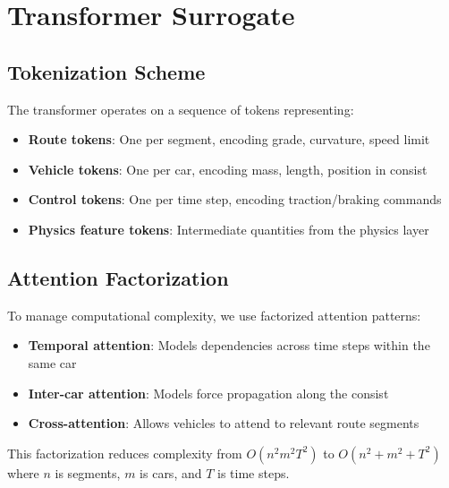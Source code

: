 
\section{Transformer Surrogate}

\subsection{Tokenization Scheme}

The transformer operates on a sequence of tokens representing:
\begin{itemize}
    \item \textbf{Route tokens}: One per segment, encoding grade, curvature, speed limit
    \item \textbf{Vehicle tokens}: One per car, encoding mass, length, position in consist
    \item \textbf{Control tokens}: One per time step, encoding traction/braking commands
    \item \textbf{Physics feature tokens}: Intermediate quantities from the physics layer
\end{itemize}


\subsection{Attention Factorization}

To manage computational complexity, we use factorized attention patterns:
\begin{itemize}
    \item \textbf{Temporal attention}: Models dependencies across time steps within the same car
    \item \textbf{Inter-car attention}: Models force propagation along the consist
    \item \textbf{Cross-attention}: Allows vehicles to attend to relevant route segments
\end{itemize}

This factorization reduces complexity from $O(n^2 m^2 T^2)$ to $O(n^2 + m^2 + T^2)$ where $n$ is segments, $m$ is cars, and $T$ is time steps.


